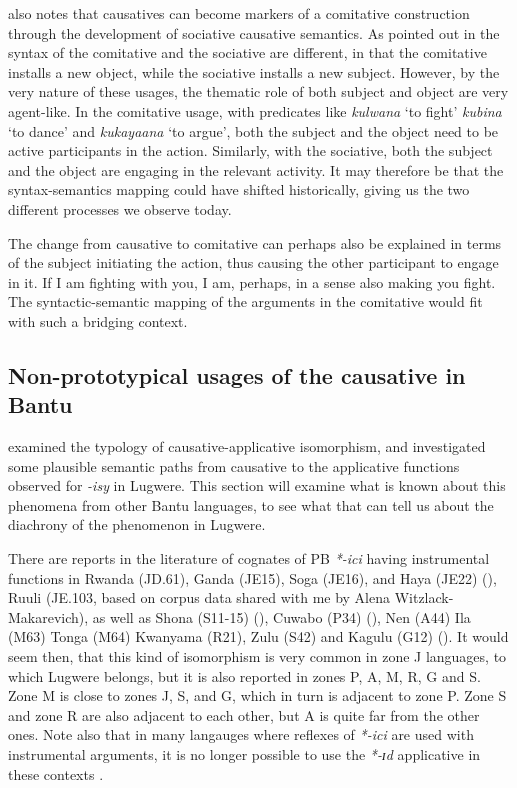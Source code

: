 \documentclass[output=paper,colorlinks,citecolor=brown,draftmode]{langscibook}
\begin{document}
\citet{peterson2006applicative} also notes that causatives can become markers of a comitative construction through the development of sociative causative semantics. As pointed out in  the syntax of the comitative and the sociative are different, in that the comitative installs a new object, while the sociative installs a new subject. However, by the very nature of these usages, the thematic role of both subject and object are very agent-like. In the comitative usage, with predicates like \emph{kulwana} `to fight' \emph{kubina} `to dance' and \emph{kukayaana} `to argue', both the subject and the object need to be active participants in the action. Similarly, with the sociative, both the subject and the object are engaging in the relevant activity. It may therefore be that the syntax-semantics mapping could have shifted historically, giving us the two different processes we observe today. 

The change from causative to comitative can perhaps also be explained in terms of the subject initiating the action, thus causing the other participant to engage in it. If I am fighting with you, I am, perhaps, in a sense also making you fight. The syntactic-semantic mapping of the arguments in the comitative would fit with such a bridging context. 

\subsection{Non-prototypical usages of the causative in Bantu}

 examined the typology of causative-applicative isomorphism, and investigated some plausible semantic paths from causative to the applicative functions observed for \emph{-isy} in Lugwere. This section will examine what is known about this phenomena from other Bantu languages, to see what that can tell us about the diachrony of the phenomenon in Lugwere. 

There are reports in the literature of cognates of PB \emph{*-ici} having instrumental functions in Rwanda (JD.61), Ganda (JE15), Soga (JE16), and Haya (JE22) (\cite{pacchiarotti2020bantu}), Ruuli (JE.103, based on corpus data shared with me by Alena Witzlack-Makarevich), as well as Shona (S11-15) (\cite{peterson2006applicative}), Cuwabo (P34) (\cite{pacchiarotti2020bantu}), Nen (A44) Ila (M63) Tonga (M64) Kwanyama (R21), Zulu (S42) and Kagulu (G12) (\cite{schadeberg2019word}). It would seem then, that this kind of isomorphism is very common in zone J languages, to which Lugwere belongs, but it is also reported in zones P, A, M, R, G and S. Zone M is close to zones J,  S, and G, which in turn is adjacent to zone P. Zone S and zone R are also adjacent to each other, but A is quite far from the other ones. Note also that in many langauges where reflexes of \emph{*-ici} are used with instrumental arguments, it is no longer possible to use the \emph{*-ɪd} applicative in these contexts \citep{pacchiarotti2020bantu}.
\end{document}
